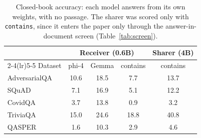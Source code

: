 \begin{table}[t]
\centering\small
\caption{Closed-book accuracy: each model answers from its own weights, with no passage. The
sharer was scored only with \texttt{contains}, since it enters the paper only through the
answer-in-document screen (Table~\ref{tab:screen}).}
\label{tab:closedbook}
\begin{tabular}{lcccc}
\toprule
& \multicolumn{3}{c}{Receiver (0.6B)} & Sharer (4B) \\
\cmidrule(lr){2-4}\cmidrule(lr){5-5}
Dataset & phi-4 & Gemma & contains & contains \\
\midrule
AdversarialQA & 10.6 & 18.5 & 7.7 & 13.7 \\
SQuAD & 7.1 & 16.9 & 5.1 & 12.2 \\
CovidQA & 3.7 & 13.8 & 0.9 & 3.2 \\
TriviaQA & 15.0 & 24.6 & 18.8 & 40.8 \\
QASPER & 1.6 & 10.3 & 2.9 & 4.6 \\
\bottomrule
\end{tabular}
\end{table}
